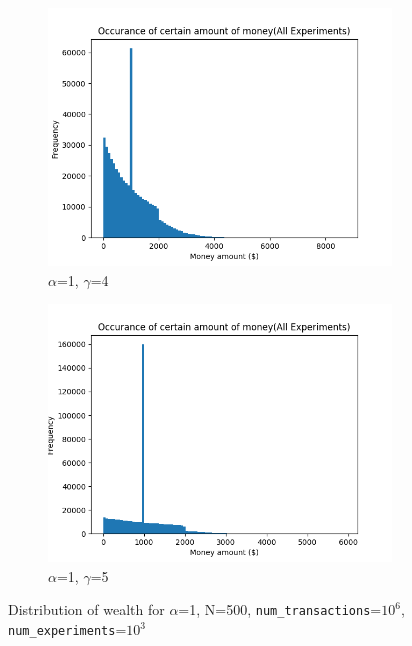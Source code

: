 \documentclass[12pt]{article} %
\begin{document}
\begin{figure}[h!]
\begin{subfigure}{\scaleTextWidth\textwidth}
		\includegraphics[scale=\scaleResultsA]{a1g4.png}
		\caption{$\alpha$=1, $\gamma$=4}
		\label{fig:a1g4}
	\end{subfigure}
	\begin{subfigure}{\scaleTextWidth\textwidth}
		\includegraphics[scale=\scaleResultsA]{a1g5.png}
		\caption{$\alpha$=1, $\gamma$=5}
		\label{fig:a1g5}
	\end{subfigure}
	\caption{Distribution of wealth for $\alpha$=1, N=500,
	\texttt{num\_transactions}=$10^6$, \texttt{num\_experiments}=$10^3$}
\end{figure}
\end{document}
